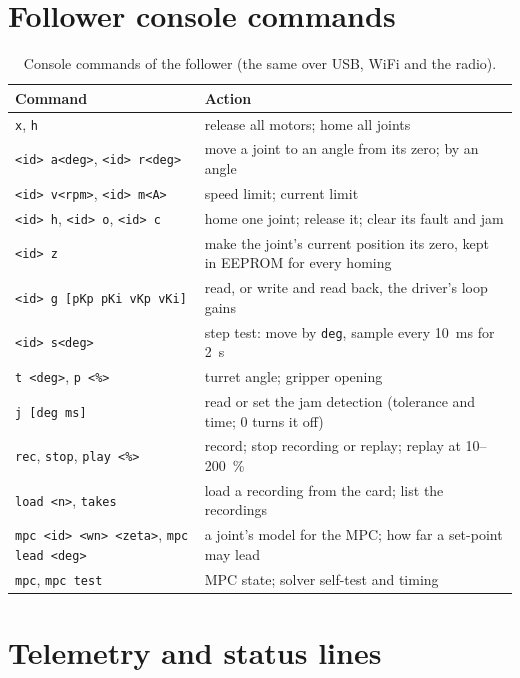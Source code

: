 \documentclass[11pt,a4paper]{article}
\newcommand{\cmd}[1]{\texttt{#1}}
\begin{document}
\appendix
\section{Follower console commands}
\label{app:commands}

\begin{table}[H]
\centering\small
\begin{tabularx}{\linewidth}{@{}lL@{}}
\toprule
Command & Action \\
\midrule
\cmd{x}, \cmd{h} & release all motors; home all joints \\
\cmd{<id> a<deg>}, \cmd{<id> r<deg>} & move a joint to an angle from its zero; by an angle \\
\cmd{<id> v<rpm>}, \cmd{<id> m<A>} & speed limit; current limit \\
\cmd{<id> h}, \cmd{<id> o}, \cmd{<id> c} & home one joint; release it; clear its fault and jam \\
\cmd{<id> z} & make the joint's current position its zero, kept in EEPROM for every homing \\
\cmd{<id> g [pKp pKi vKp vKi]} & read, or write and read back, the driver's loop gains \\
\cmd{<id> s<deg>} & step test: move by \cmd{deg}, sample every \SI{10}{\milli\second} for \SI{2}{\second} \\
\cmd{t <deg>}, \cmd{p <\%>} & turret angle; gripper opening \\
\cmd{j [deg ms]} & read or set the jam detection (tolerance and time; 0 turns it off) \\
\cmd{rec}, \cmd{stop}, \cmd{play <\%>} & record; stop recording or replay; replay at 10--\SI{200}{\percent} \\
\cmd{load <n>}, \cmd{takes} & load a recording from the card; list the recordings \\
\cmd{mpc <id> <wn> <zeta>}, \cmd{mpc lead <deg>} & a joint's model for the MPC; how far a set-point may lead \\
\cmd{mpc}, \cmd{mpc test} & MPC state; solver self-test and timing \\
\bottomrule
\end{tabularx}
\caption{Console commands of the follower (the same over USB, WiFi and the radio).}
\end{table}

\section{Telemetry and status lines}
\label{app:protocol}
\end{document}
